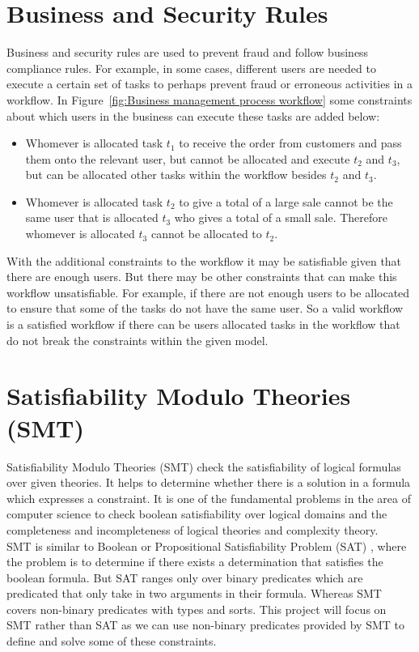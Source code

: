 \documentclass[a4paper]{report}
\begin{document}
\section{Business and Security Rules}
Business and security rules are used to prevent fraud and follow business compliance rules. For example, in some cases, different users are needed to execute a certain set of tasks to perhaps prevent fraud or erroneous activities in a workflow. In Figure~\ref{fig:Business management process workflow} some constraints about which users in the business can execute these tasks are added below:
\begin{itemize}
\item Whomever is allocated task $t_{1}$ to receive the order from customers and pass them onto the relevant user, but cannot be allocated and execute $t_{2}$ and $t_{3}$, but can be allocated other tasks within the workflow besides $t_{2}$ and $t_{3}$.
\item Whomever is allocated task $t_{2}$ to give a total of a large sale cannot be the same user that is allocated $t_{3}$ who gives a total of a small sale. Therefore whomever is allocated $t_{3}$ cannot be allocated to $t_{2}$.
\end{itemize}
With the additional constraints to the workflow it may be satisfiable given that there are enough users. But there may be other constraints that can make this workflow unsatisfiable. For example, if there are not enough users to be allocated to ensure that some of the tasks do not have the same user. So a valid workflow is a satisfied workflow if there can be users allocated tasks in the workflow that do not break the constraints within the given model.\\

\section{Satisfiability Modulo Theories (SMT)}
Satisfiability Modulo Theories (SMT)\cite{smt_appetizer} check the satisfiability of logical formulas over given theories. It helps to determine whether there is a solution in a formula which expresses a constraint. It is one of the fundamental problems in the area of computer science to check boolean satisfiability over logical domains and the completeness and incompleteness of logical theories and complexity theory. \\
SMT is similar to Boolean or Propositional Satisfiability Problem (SAT)\cite{sat} , where the problem is to determine if there exists a determination that satisfies the boolean formula. But SAT ranges only over binary predicates which are predicated that only take in two arguments in their formula. Whereas SMT covers non-binary predicates with types and sorts. This project will focus on SMT rather than SAT as we can use non-binary predicates provided by SMT to define and solve some of these constraints. \\
\end{document}
